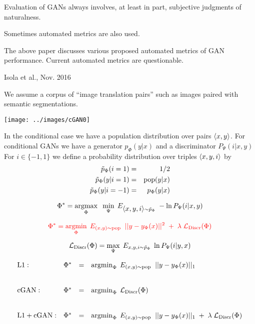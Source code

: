 {\vfill
Evaluation of GANs always involves, at least in part, subjective judgments of naturalness.

\vfill
Sometimes automated metrics are also used.

\vfill
The above paper discusses various proposed automated metrics of GAN performance.  Current automated metrics are questionable.


{Isola et al., Nov. 2016}

We assume a corpus of ``image translation pairs'' such as images paired with semantic segmentations.

\centerline{\texttt{[image: ../images/cGAN0]}}

In the conditional case we have a population distribution over pairs ${\mbox{$\langle x,y\rangle$}}$.
For conditional GANs we have a generator $p_\Phi(y|x)$ and a discriminator $P_\Psi(i|x,y)$
For $i \in \{-1,1\}$ we define a probability distribution over triples
${\mbox{$\langle x,y,i\rangle$}}$ by
\begin{eqnarray*}
\tilde{p}_\Phi(i = 1) & = & 1/2 \\
\tilde{p}_\Phi(y|i=1) & =&  \mathrm{pop}(y|x) \\
\tilde{p}_\Phi(y|i=-1) & = & p_\Phi(y|x)
\end{eqnarray*}

{\color{red} $$\Phi^* = \operatorname*{argmax}_\Phi\;\;\min_\Psi\;E_{{\mbox{$\langle x,y,i\rangle$}} \sim \tilde{p}_\Phi}\;-\ln P_\Psi(i|x,y)$$}


$${\color{red} \Phi^* = \operatorname*{argmin}_\Phi\;E_{(x,y) \sim \mathrm{pop}}\;\; ||y- y_\Phi(x)||^2\; + \; \lambda\; {\cal L}_{\mathrm{Discr}}(\Phi)}$$

\vfill
$${\cal L}_\mathrm{Discr}(\Phi) = \max_\Psi \;E_{x,y,i \sim \tilde{p}_\Phi}\; \ln P_\Psi(i|y,x)$$


{\huge
$$\begin{array}{lrcl}
\mathrm{L1:} & \Phi^* & = & \operatorname*{argmin}_\Phi\;E_{(x,y) \sim \mathrm{pop}}\;\; ||y - y_\Phi(x)||_1 \\
\\
\\
\mathrm{cGAN:} & \Phi^* & = & \operatorname*{argmin}_\Phi\;{\cal L}_{\mathrm{Discr}}(\Phi) \\
\\
\\
\mathrm{L1 + cGAN:} & \Phi^* & = & \operatorname*{argmin}_\Phi\;E_{(x,y) \sim \mathrm{pop}}\;\; ||y - y_\Phi(x)||_1\; +\; \lambda\; {\cal L}_\mathrm{Discr}(\Phi)
\end{array}$$
}


}
